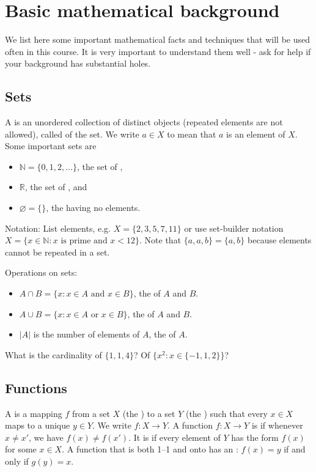 \chapter{Basic mathematical background}
\label{ch:app:mathtools}

We list here some important mathematical facts and techniques  that will be used often in this course. 
It is very important to understand them well - ask for help if your background has substantial holes.


\section{Sets}
A  is an unordered collection of distinct objects (repeated elements are not allowed), called  of the set. 
We write $a \in X$ to mean that $a$ is an element of $X$. Some important sets are 
\begin{itemize}
\item $\mathbb{N} = \{0, 1, 2, \dots\}$, the set of ,
\item $\mathbb{R}$, the set of , and
\item $\varnothing = \{\}$, the  having no elements.
\end{itemize}

Notation: List elements, e.g. $X = \{2,3,5,7,11\}$ or use set-builder notation $X = \{x \in \mathbb{N} : x \text{ is prime and } x < 12\}$. 
Note that $\{a, a, b\} = \{a, b\}$ because elements cannot be repeated in a set.

Operations on sets: 
\begin{itemize}
\item $A\cap B = \{x: x \in A \text{ and } x \in B\}$, the  of $A$ and $B$.
\item $A\cup B = \{x: x \in A \text{ or  } x \in B\}$, the  of $A$ and $B$.
\item $|A|$ is the number of elements of $A$, the  of $A$.
\end{itemize}

\begin{Boxample}[4]
What is the cardinality of $\{1,1,4\}$? Of $\{x^2 : x \in \{-1,1,2\}\}$?
\end{Boxample}


\section{Functions}
A  is a mapping $f$ from a set $X$ (the ) to a set $Y$ (the ) such that every $x \in X$ maps to a unique $y \in Y$. 
We write $f \colon X \to Y$. A function $f \colon X \to Y$ is  if whenever $x \neq x'$, we have $f(x) \neq f(x')$.
 It is  if every element of $Y$ has the form $f(x)$ for some $x\in X$. 
 A function that is both 1--1 and onto has an : $f(x) = y$ if and only if $g(y) = x$. 

